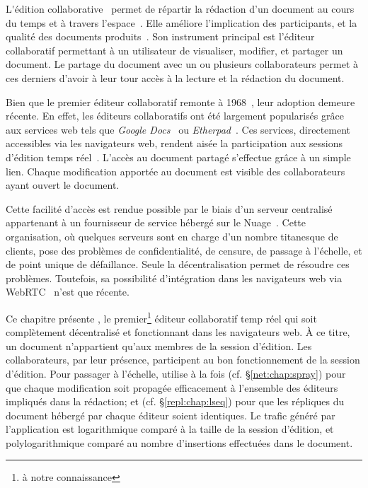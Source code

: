 
\lettrine{L}'édition collaborative~\cite{ellis1989concurrency,
  johansen1988groupware} permet de répartir la rédaction d'un document au cours
du temps et à travers l'espace~\cite{desanctis1987foundation,
  grudin1994computersupported, johansen1988groupware}. Elle améliore
l'implication des participants, et la qualité des documents
produits~\cite{giles2005internet, noel2004empirical}. Son instrument principal
est l'éditeur collaboratif permettant à un utilisateur de visualiser, modifier,
et partager un document. Le partage du document avec un ou plusieurs
collaborateurs permet à ces derniers d'avoir à leur tour accès à la lecture et
la rédaction du document.

Bien que le premier éditeur collaboratif remonte à
1968~\cite{engelbart1968research}, leur adoption demeure récente. En effet, les
éditeurs collaboratifs ont été largement popularisés grâce aux services web tels
que \emph{Google Docs}~\cite{googledocs} ou \emph{Etherpad}~\cite{etherpad}. Ces
services, directement accessibles via les navigateurs web, rendent aisée la
participation aux sessions d'édition temps réel~\cite{mogan2010impact}. L'accès
au document partagé s'effectue grâce à un simple lien. Chaque modification
apportée au document est visible des collaborateurs ayant ouvert le document.

Cette facilité d'accès est rendue possible par le biais d'un serveur centralisé
appartenant à un fournisseur de service hébergé sur le
Nuage~\cite{mell2011national}. Cette organisation, où quelques serveurs sont en
charge d'un nombre titanesque de clients, pose des problèmes de confidentialité,
de censure, de passage à l'échelle, et de point unique de défaillance. Seule la
décentralisation permet de résoudre ces problèmes. Toutefois, sa possibilité
d'intégration dans les navigateurs web via WebRTC~\cite{webrtc} n'est que
récente.


Ce chapitre présente \CRATE, le premier\footnote{à notre connaissance} éditeur
collaboratif temp réel qui soit complètement décentralisé et fonctionnant dans
les navigateurs web. À ce titre, un document n'appartient qu'aux membres de la
session d'édition. Les collaborateurs, par leur présence, participent au bon
fonctionnement de la session d'édition. Pour passager à l'échelle, \CRATE
utilise à la fois \SPRAY (cf. §\ref{net:chap:spray}) pour que chaque
modification soit propagée efficacement à l'ensemble des éditeurs impliqués dans
la rédaction; et \LSEQ (cf. §\ref{repl:chap:lseq}) pour que les répliques du
document hébergé par chaque éditeur soient identiques. Le trafic généré par
l'application est logarithmique comparé à la taille de la session d'édition, et
polylogarithmique comparé au nombre d'insertions effectuées dans le document.

